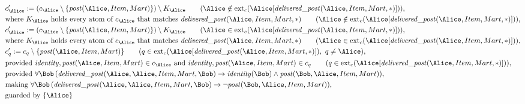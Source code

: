 \begin{align*}
&
c'_
{
\Alice
}
 := 
(c_
{
\Alice
}
 \setminus 
\{
\mathit{\detokenize{
post
}}
(
\Alice
,
Item
,
Mart
)
\}
) \setminus K_
{
\Alice
}
 \qquad (
\Alice
 \notin 
\mathrm{ext}_c(
\Alice
[
\mathit{\detokenize{
delivered_post
}}
(
\Alice
,
Item
,
Mart
,
\ast
)
]
)
)
,\\
&
\text{where } K_
{
\Alice
}
 \text{ holds every atom of } c_
{
\Alice
}
 \text{ that matches } 
\mathit{\detokenize{
delivered_post
}}
(
\Alice
,
Item
,
Mart
,
\ast
)
 \qquad (
\Alice
 \notin 
\mathrm{ext}_c(
\Alice
[
\mathit{\detokenize{
delivered_post
}}
(
\Alice
,
Item
,
Mart
,
\ast
)
]
)
)
,\\
&
c'_
{
\Alice
}
 := 
(c_
{
\Alice
}
 \setminus 
\{
\mathit{\detokenize{
post
}}
(
\Alice
,
Item
,
Mart
)
\}
) \setminus K_
{
\Alice
}
 \qquad (
\Alice
 \in 
\mathrm{ext}_c(
\Alice
[
\mathit{\detokenize{
delivered_post
}}
(
\Alice
,
Item
,
Mart
,
\ast
)
]
)
)
,\\
&
\text{where } K_
{
\Alice
}
 \text{ holds every atom of } c_
{
\Alice
}
 \text{ that matches } 
\mathit{\detokenize{
delivered_post
}}
(
\Alice
,
Item
,
Mart
,
\ast
)
 \qquad (
\Alice
 \in 
\mathrm{ext}_c(
\Alice
[
\mathit{\detokenize{
delivered_post
}}
(
\Alice
,
Item
,
Mart
,
\ast
)
]
)
)
,\\
&
c'_
q
 := 
c_
q
 \setminus 
\{
\mathit{\detokenize{
post
}}
(
\Alice
,
Item
,
Mart
)
\}
 \qquad (
q
 \in 
\mathrm{ext}_c(
\Alice
[
\mathit{\detokenize{
delivered_post
}}
(
\Alice
,
Item
,
Mart
,
\ast
)
]
)
,\ 
q \neq 
\Alice
)
,\\
&
\text{provided } 
\mathit{\detokenize{
identity
}}
,
\mathit{\detokenize{
post
}}
(
\Alice
,
Item
,
Mart
)
 \in c_
{
\Alice
}
 \text{ and } 
\mathit{\detokenize{
identity
}}
,
\mathit{\detokenize{
post
}}
(
\Alice
,
Item
,
Mart
)
 \in c_
q
 \qquad (
q \in 
\mathrm{ext}_c(
\Alice
[
\mathit{\detokenize{
delivered_post
}}
(
\Alice
,
Item
,
Mart
,
\ast
)
]
)
)
,\\
&
\text{provided } 
\forall 
\Bob
\,(
\mathit{\detokenize{
delivered_post
}}
(
\Alice
,
\Alice
,
Item
,
Mart
,
\Bob
)
\rightarrow
\mathit{\detokenize{
identity
}}
(
\Bob
)
\land
\mathit{\detokenize{
post
}}
(
\Bob
,
\Alice
,
Item
,
Mart
)
)
,\\
&
\text{making } 
\forall 
\Bob
\,(
\mathit{\detokenize{
delivered_post
}}
(
\Alice
,
\Alice
,
Item
,
Mart
,
\Bob
)
\rightarrow
\neg 
\mathit{\detokenize{
post
}}
(
\Bob
,
\Alice
,
Item
,
Mart
)
)
,\\
&
\text{guarded by } \{
\Alice
\}
\end{align*}
